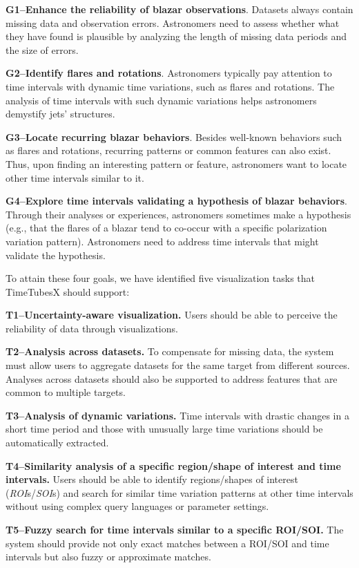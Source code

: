 \noindent\textbf{G1--Enhance the reliability of blazar observations}. 
Datasets always contain missing data and observation errors. 
Astronomers need to assess whether what they have found is plausible by analyzing the length of missing data periods and the size of errors.

\noindent\textbf{G2--Identify flares and rotations}. 
Astronomers typically pay attention to time intervals with dynamic time variations,
such as flares and rotations.
The analysis of time intervals with such dynamic variations helps astronomers demystify jets' structures.

\noindent\textbf{G3--Locate recurring blazar behaviors}.
Besides well-known behaviors such as flares and rotations, 
recurring patterns or common features can also exist.
Thus, upon finding an interesting pattern or feature, 
astronomers want to locate other time intervals similar to it.

\noindent\textbf{G4--Explore time intervals validating a hypothesis of blazar behaviors}.
Through their analyses or experiences, astronomers sometimes make a hypothesis (e.g., that the flares of a blazar tend to co-occur with a specific polarization variation pattern). 
Astronomers need to address time intervals that might validate the hypothesis.

To attain these four goals, we have identified five visualization tasks that TimeTubesX should support:

\noindent\textbf{T1--Uncertainty-aware visualization.} 
Users should be able to perceive the reliability of data through visualizations. 

\noindent\textbf{T2--Analysis across datasets.} 
To compensate for missing data, 
the system must allow users to aggregate datasets for the same target from different sources.
Analyses across datasets should also be supported to address features that are common to multiple targets.

\noindent\textbf{T3--Analysis of dynamic variations.} 
Time intervals with drastic changes in a short time period and those with unusually large time variations should be automatically extracted.

\noindent\textbf{T4--Similarity analysis of a specific region/shape of interest and time intervals.} 
Users should be able to identify regions/shapes of interest (\emph{ROI}s/\emph{SOI}s) and search for similar time variation patterns at other time intervals without using complex query languages or parameter settings.

\noindent\textbf{T5--Fuzzy search for time intervals similar to a specific ROI/SOI.}
The system should provide not only exact matches between a ROI/SOI and time intervals but also fuzzy or approximate matches. 

